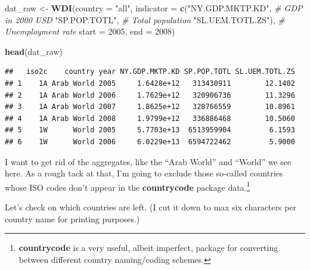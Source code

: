 \documentclass[12pt,oneside,openany]{book}
\newenvironment{Shaded}{\begin{snugshade}}{\end{snugshade}}
\newcommand{\KeywordTok}[1]{\textcolor[rgb]{0.13,0.29,0.53}{\textbf{#1}}}
\newcommand{\DataTypeTok}[1]{\textcolor[rgb]{0.13,0.29,0.53}{#1}}
\newcommand{\DecValTok}[1]{\textcolor[rgb]{0.00,0.00,0.81}{#1}}
\newcommand{\StringTok}[1]{\textcolor[rgb]{0.31,0.60,0.02}{#1}}
\newcommand{\CommentTok}[1]{\textcolor[rgb]{0.56,0.35,0.01}{\textit{#1}}}
\newcommand{\OperatorTok}[1]{\textcolor[rgb]{0.81,0.36,0.00}{\textbf{#1}}}
\newcommand{\NormalTok}[1]{#1}
\let\rmarkdownfootnote\footnote%
\def\footnote{\protect\rmarkdownfootnote}
\begin{document}
\begin{Shaded}
\begin{Highlighting}[]
\NormalTok{dat_raw <-}\StringTok{ }\KeywordTok{WDI}\NormalTok{(}\DataTypeTok{country =} \StringTok{"all"}\NormalTok{,}
               \DataTypeTok{indicator =} \KeywordTok{c}\NormalTok{(}\StringTok{"NY.GDP.MKTP.KD"}\NormalTok{,  }\CommentTok{# GDP in 2000 USD}
                             \StringTok{"SP.POP.TOTL"}\NormalTok{,     }\CommentTok{# Total population}
                             \StringTok{"SL.UEM.TOTL.ZS"}\NormalTok{), }\CommentTok{# Unemployment rate}
               \DataTypeTok{start =} \DecValTok{2005}\NormalTok{,}
               \DataTypeTok{end =} \DecValTok{2008}\NormalTok{)}

\KeywordTok{head}\NormalTok{(dat_raw)}
\end{Highlighting}
\end{Shaded}

\begin{verbatim}
##   iso2c    country year NY.GDP.MKTP.KD SP.POP.TOTL SL.UEM.TOTL.ZS
## 1    1A Arab World 2005     1.6428e+12   313430911        12.1402
## 2    1A Arab World 2006     1.7629e+12   320906736        11.3296
## 3    1A Arab World 2007     1.8625e+12   328766559        10.8961
## 4    1A Arab World 2008     1.9799e+12   336886468        10.5060
## 5    1W      World 2005     5.7703e+13  6513959904         6.1593
## 6    1W      World 2006     6.0229e+13  6594722462         5.9000
\end{verbatim}

I want to get rid of the aggregates, like the ``Arab World'' and
``World'' we see here. As a rough tack at that, I'm going to exclude
those so-called countries whose ISO codes don't appear in the
\textbf{countrycode} package data.\footnote{\textbf{countrycode} is a
  very useful, albeit imperfect, package for converting between
  different country naming/coding schemes.}

\begin{Shaded}
\end{Shaded}

Let's check on which countries are left. (I cut it down to max six
characters per country name for printing purposes.)
\end{document}
